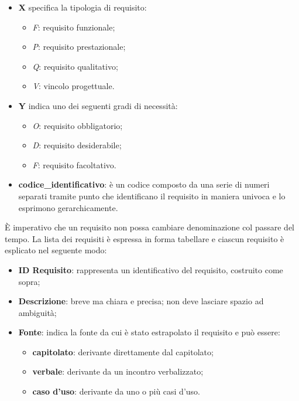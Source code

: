                 \begin{itemize}
                    \item \textbf{X} specifica la tipologia di requisito:
                        \begin{itemize}
                            \item \textit{F}: requisito funzionale;
                            \item \textit{P}: requisito prestazionale;
                            \item \textit{Q}: requisito qualitativo;
                            \item \textit{V}: vincolo progettuale.
                        \end{itemize}
                    \item \textbf{Y} indica uno dei seguenti gradi di necessità:
                        \begin{itemize}
                            \item \textit{O}: requisito obbligatorio;
                            \item \textit{D}: requisito desiderabile;
                            \item \textit{F}: requisito facoltativo.
                        \end{itemize}
                    \item \textbf{codice\_identificativo}: è un codice composto da una serie di numeri separati tramite
                    punto che identificano il requisito in maniera univoca e lo esprimono gerarchicamente.
                \end{itemize}
				
            È imperativo che un requisito non possa cambiare denominazione col passare del tempo.
            La lista dei requisiti è espressa in forma tabellare e ciascun requisito è esplicato nel seguente modo:

                \begin{itemize}
                    \item \textbf{ID Requisito}: rappresenta un identificativo del requisito, costruito come sopra;
                    \item \textbf{Descrizione}: breve ma chiara e precisa; non deve lasciare spazio ad ambiguità;
                    \item \textbf{Fonte}: indica la fonte da cui è stato estrapolato il requisito e può essere:
                        \begin{itemize}
                            \item \textbf{capitolato}: derivante direttamente dal capitolato;
                            \item \textbf{verbale}: derivante da un incontro verbalizzato;
                            \item \textbf{caso d'uso}: derivante da uno o più casi d'uso.
                        \end{itemize}
                \end{itemize}

